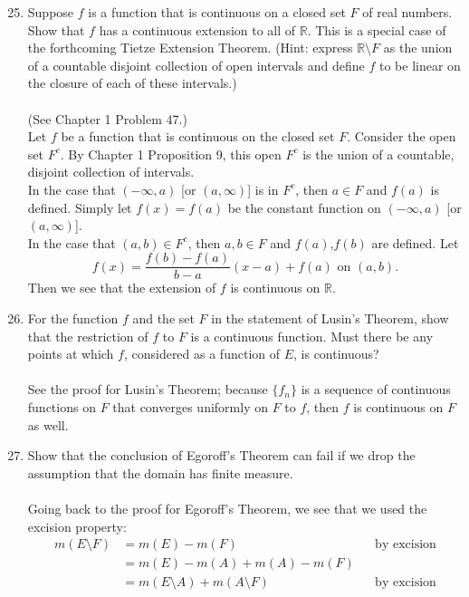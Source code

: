 \begin{enumerate}
	\setcounter{enumi}{24}
    \item Suppose $f$ is a function that is continuous on a closed set $F$ of real numbers. Show that $f$ has a continuous extension to all of $\mathbb{R}$. This is a special case of the forthcoming Tietze Extension Theorem.
    (Hint: express $\mathbb{R}\setminus F$ as the union of a countable disjoint collection of open intervals and define $f$ to be linear on the closure of each of these intervals.)\\
    \\(See Chapter 1 Problem 47.)
    \\Let $f$ be a function that is continuous on the closed set $F$.
    Consider the open set $F^c$.
    By Chapter 1 Proposition 9, this open  $F^c$ is the union of a countable, disjoint collection of intervals.
    \\In the case that $(-\infty,a)$ [or $(a,\infty)$] is in $F^c$, then $a \in F$ and $f(a)$ is defined.
	Simply let $f(x)=f(a)$ be the constant function on $(-\infty,a)$ [or $(a,\infty)$].
	\\In the case that $(a,b) \in F^c$, then $a,b\in F$ and $f(a)$,$f(b)$ are defined.
	Let 
	\[
		f(x)=\frac{f(b)-f(a)}{b-a}(x-a)+f(a)\text{ on } (a,b).
	\]
    Then we see that the extension of $f$ is continuous on $\mathbb{R}$.
    \item For the function $f$ and the set $F$ in the statement of Lusin's Theorem, show that the restriction of $f$ to $F$ is a continuous function.
    Must there be any points at which $f$, considered as a function of $E$, is continuous?\\
    \\See the proof for Lusin's Theorem; because $\{f_n\}$ is a sequence of continuous functions on $F$ that converges uniformly on $F$ to $f$, then $f$ is continuous on $F$ as well.
    \item Show that the conclusion of Egoroff's Theorem can fail if we drop the assumption that the domain has finite measure.\\
    \\Going back to the proof for Egoroff's Theorem, we see that we used the excision property:
    \begin{align*}
        m(E\setminus F)&=m(E)-m(F)&&\text{by excision}\\
        &= m(E)-m(A)+m(A)-m(F)\\
        &=m(E\setminus A)+m(A\setminus F)&&\text{by excision}\\

\end{align*}
\end{enumerate}

